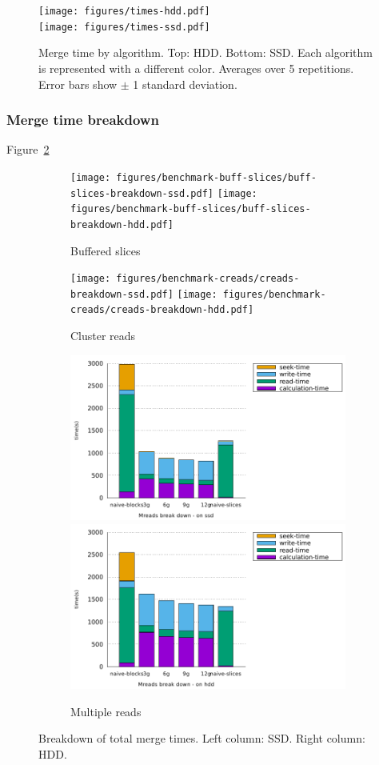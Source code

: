 \documentclass[10pt, conference, compsocconf]{IEEEtran}
\begin{document}
\begin{figure}[h]
  \centering
  \texttt{[image: figures/times-hdd.pdf]}\\
  \texttt{[image: figures/times-ssd.pdf]}
  \hfill
  \caption{Merge time by algorithm. Top: HDD. Bottom: SSD. Each
    algorithm is represented with a different color. Averages over 5
    repetitions. Error bars show $\pm$ 1 standard deviation. }
\label{fig:merge-time}
\end{figure}

\subsubsection{Merge time breakdown}
Figure~\ref{fig:breakdowns-ssd} 
\begin{figure}
  \begin{subfigure}[b]{\columnwidth}
    \texttt{[image: figures/benchmark-buff-slices/buff-slices-breakdown-ssd.pdf]}
    \texttt{[image: figures/benchmark-buff-slices/buff-slices-breakdown-hdd.pdf]}
    \caption{Buffered slices}
  \end{subfigure}
  \begin{subfigure}[b]{\columnwidth}
    \texttt{[image: figures/benchmark-creads/creads-breakdown-ssd.pdf]}
    \texttt{[image: figures/benchmark-creads/creads-breakdown-hdd.pdf]}
    \caption{Cluster reads}
  \end{subfigure}
  \begin{subfigure}[b]{\columnwidth}
    \includegraphics[width=0.45\columnwidth]{figures/benchmark-mreads/mreads-breakdown-ssd.pdf}
    \includegraphics[width=0.45\columnwidth]{figures/benchmark-mreads/mreads-breakdown-hdd.pdf}
    \caption{Multiple reads}
  \end{subfigure}
  \caption{Breakdown of total merge times. Left column: SSD. Right column: HDD.}
  \label{fig:breakdowns-ssd}
\end{figure}
\end{document}
